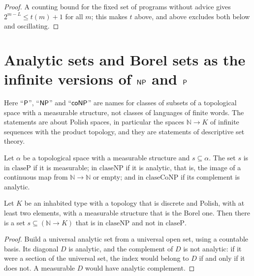 \begin{proof}
  \leanok
  A counting bound for the fixed set of programs without advice gives $2^{m-L} \le t(m) + 1$ for all $m$; this makes $t$
  above, and above excludes both below and oscillating.
\end{proof}

\section{Analytic sets and Borel sets as the infinite versions of $\mathsf{NP}$ and $\mathsf{P}$}
\label{sec:infinite-analytic}

Here ``$\mathsf{P}$'', ``$\mathsf{NP}$'' and ``$\mathsf{coNP}$'' are names for classes of subsets of a topological space with a
measurable structure, not classes of languages of finite words. The statements are about Polish spaces, in particular
the spaces $\mathbb{N} \to K$ of infinite sequences with the product topology, and they are statements of descriptive set
theory.

\begin{definition}
  \label{def:infinite-clases-analiticas}
  \leanok
  \own{}
  Let $\alpha$ be a topological space with a measurable structure and $s \subseteq \alpha$. The set $s$ is in
  $\mathrm{claseP}$ if it is measurable; in $\mathrm{claseNP}$ if it is analytic, that is, the image of a continuous
  map from $\mathbb{N} \to \mathbb{N}$ or empty; and in $\mathrm{claseCoNP}$ if its complement is analytic.
\end{definition}

\begin{theorem}
  \label{thm:infinite-p-ne-np}
  \leanok
  \own{}
  Let $K$ be an inhabited type with a topology that is discrete and Polish, with at least two elements, with a
  measurable structure that is the Borel one. Then there is a set $s \subseteq (\mathbb{N} \to K)$ that is in
  $\mathrm{claseNP}$ and not in $\mathrm{claseP}$.
\end{theorem}

\begin{proof}
  \leanok
  Build a universal analytic set from a universal open set, using a countable basis. Its diagonal $D$ is analytic, and
  the complement of $D$ is not analytic: if it were a section of the universal set, the index would belong to $D$ if and
  only if it does not. A measurable $D$ would have analytic complement.
\end{proof}

